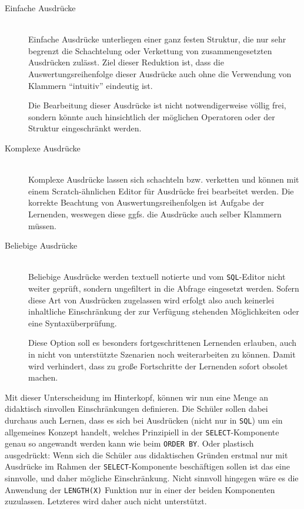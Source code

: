 \begin{description}
\item[Einfache Ausdrücke] \hfill\\
  Einfache Ausdrücke unterliegen einer ganz festen Struktur, die nur sehr begrenzt die Schachtelung oder Verkettung von zusammengesetzten Ausdrücken zulässt. Ziel dieser Reduktion ist, dass die Auswertungsreihenfolge dieser Ausdrücke auch ohne die Verwendung von Klammern ``intuitiv'' eindeutig ist.

  Die Bearbeitung dieser Ausdrücke ist nicht notwendigerweise völlig frei, sondern könnte auch hinsichtlich der möglichen Operatoren oder der Struktur eingeschränkt werden.
\item[Komplexe Ausdrücke] \hfill\\
  Komplexe Ausdrücke lassen sich schachteln bzw. verketten und können mit einem Scratch-ähnlichen Editor für Ausdrücke frei bearbeitet werden. Die korrekte Beachtung von Auswertungsreihenfolgen ist Aufgabe der Lernenden, weswegen diese ggfs. die Ausdrücke auch selber Klammern müssen.

\item[Beliebige Ausdrücke] \hfill\\
  Beliebige Ausdrücke werden textuell notierte und vom \texttt{SQL}-Editor nicht weiter geprüft, sondern ungefiltert in die Abfrage eingesetzt werden. Sofern diese Art von Ausdrücken zugelassen wird erfolgt also auch keinerlei inhaltliche Einschränkung der zur Verfügung stehenden Möglichkeiten oder eine Syntaxüberprüfung.

  Diese Option soll es besonders fortgeschrittenen Lernenden erlauben, auch in nicht von \idename{} unterstützte Szenarien noch weiterarbeiten zu können. Damit wird verhindert, dass zu große Fortschritte der Lernenden \idename{} sofort obsolet machen.
\end{description}

Mit dieser Unterscheidung im Hinterkopf, können wir nun eine Menge an didaktisch sinvollen Einschränkungen definieren. Die Schüler sollen dabei durchaus auch Lernen, dass es sich bei Ausdrücken (nicht nur in \texttt{SQL}) um ein allgemeines Konzept handelt, welches Prinzipiell in der \texttt{SELECT}-Komponente genau so angewandt werden kann wie beim \texttt{ORDER BY}. Oder plastisch ausgedrückt: Wenn sich die Schüler aus didaktischen Gründen erstmal nur mit Ausdrücke im Rahmen der \texttt{SELECT}-Komponente beschäftigen sollen ist das eine sinnvolle, und daher mögliche Einschränkung. Nicht sinnvoll hingegen wäre es die Anwendung der \texttt{LENGTH(X)} Funktion nur in einer der beiden Komponenten zuzulassen. Letzteres wird daher auch nicht unterstützt.

